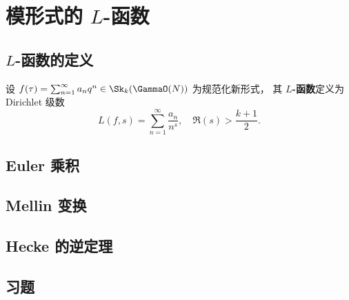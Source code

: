 \chapter{模形式的 $L$-函数}
\label{ch:l-functions}

\section{$L$-函数的定义}

\begin{definition}
设 $f(\tau) = \sum_{n=1}^{\infty} a_n q^n \in \Sk_k(\GammaO(N))$ 为规范化新形式，
其 \textbf{$L$-函数}定义为 Dirichlet 级数
\[
  L(f, s) = \sum_{n=1}^{\infty} \frac{a_n}{n^s},
  \quad \Re(s) > \frac{k+1}{2}.
\]
\end{definition}

\section{Euler 乘积}


\section{Mellin 变换}


\section{Hecke 的逆定理}


\section{习题}

